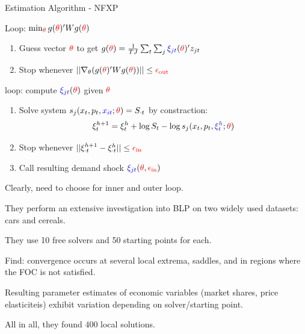 \documentclass[english]{beamer}
\begin{document}
\begin{frame}{\cite{BLP} Estimation Algorithm - NFXP}
\begin{midi}
\item {} Loop: $\min_{{\color{red}{\theta}}} g({\color{red}{\theta}})' W g({\color{red}{\theta}})$
\begin{enumerate}
\item Guess vector ${\color{red}{\theta}}$ to get $g({\color{red}{\theta}}) = \frac{1}{TJ}\sum_t \sum_j{\color{blue}{\xi_{jt}}}({\color{red}{\theta}})' z_{jt}$
\item Stop whenever $|| \nabla_\theta(g({\color{red}{\theta}})' W g({\color{red}{\theta}})) || \leq {\color{red}{\epsilon_\text{out}}}$
\end{enumerate}
\pause
\item {} loop: compute ${\color{blue}{\xi_{jt}}}({\color{red}{\theta}})$ given ${\color{red}{\theta}}$
\begin{enumerate}
\item Solve system $s_j(x_t,p_t,{\color{blue}{x_{it}}};{\color{red}{\theta}}) = S_{\cdot t}$ by  constraction:
\begin{equation*}
\xi_t^{h+1} = \xi_t^{h} + \log S_t - \log s_j(x_t,p_t,{\color{blue}{\xi_{t}^h}};{\color{red}{\theta}})
\end{equation*}
\item Stop whenever $|| \xi_{\cdot t}^{h+1} - \xi_{\cdot t}^{h}  || \leq {\color{red}{\epsilon_\text{in}}}$
\item Call resulting demand shock ${\color{blue}{\xi_{jt}}}({\color{red}{\theta}},{\color{red}{\epsilon_\text{in}}})$
\end{enumerate}
\item Clearly, need to choose  for inner and outer loop.
\end{midi}
\end{frame}

\begin{frame}{\cite{knittel2014estimation}}

\begin{midi}
\item They perform an extensive investigation into BLP on two widely used datasets: cars and cereals.
\item They use 10 free solvers and 50 starting points for each.
\item Find: convergence occurs at several local extrema, saddles, and in regions where the FOC is not satisfied.
\item Resulting parameter estimates of economic variables (market shares, price elasticiteis) exhibit  variation depending on solver/starting point.
\item All in all, they found 400 local solutions.
\end{midi}
\end{frame}
\end{document}
